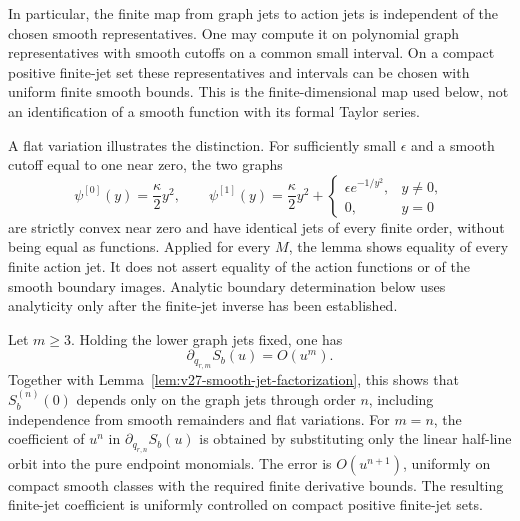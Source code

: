 In particular, the finite map from graph jets to action jets is independent
of the chosen smooth representatives.  One may compute it on polynomial
graph representatives with smooth cutoffs on a common small interval.
On a compact positive finite-jet set these representatives and intervals
can be chosen with uniform finite smooth bounds.  This is the
finite-dimensional map used below, not an identification of a smooth
function with its formal Taylor series.

A flat variation illustrates the distinction.  For sufficiently small
$\epsilon$ and a smooth cutoff equal to one near zero, the two graphs
\[
 \psi^{[0]}(y)=\frac{\kappa}{2}y^2,\qquad
 \psi^{[1]}(y)=\frac{\kappa}{2}y^2+
 \begin{cases}\epsilon e^{-1/y^2},&y\ne0,\\0,&y=0\end{cases}
\]
are strictly convex near zero and have identical jets of every finite
order, without being equal as functions.  Applied for every $M$, the
lemma shows equality of every finite action jet.  It does not assert
equality of the action functions or of the smooth boundary images.
Analytic boundary determination below uses analyticity only after the
finite-jet inverse has been established.

\begin{lemma}
\label{lem:v22-homogeneous-isolation}
Let $m\ge3$.  Holding the lower graph jets fixed, one has
\begin{equation}\label{eq:v22-variation-order}
              \partial_{q_{r,m}}S_b(u)=O(u^m).
\end{equation}
Together with Lemma~\ref{lem:v27-smooth-jet-factorization}, this shows
that $S_b^{(n)}(0)$ depends only on the graph jets through order $n$,
including independence from smooth remainders and flat variations.
For $m=n$, the coefficient of $u^n$ in
$\partial_{q_{r,n}}S_b(u)$ is obtained by substituting only the linear
half-line orbit into the pure endpoint monomials.  The error is
$O(u^{n+1})$, uniformly on compact smooth classes with the required
finite derivative bounds.  The resulting finite-jet coefficient is
uniformly controlled on compact positive finite-jet sets.
\end{lemma}

